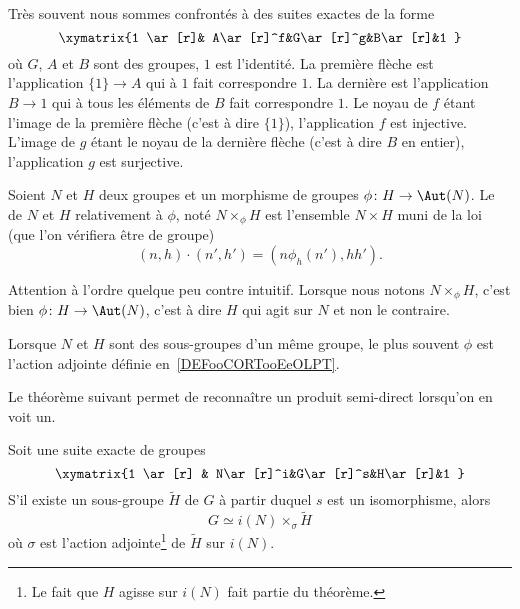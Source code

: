 Très souvent nous sommes confrontés à des suites exactes de la forme
\begin{equation}
    \xymatrix{%
    1 \ar[r]& A\ar[r]^f&G\ar[r]^g&B\ar[r]&1
       }
\end{equation}
où \( G\), \( A\) et \( B\) sont des groupes, \( 1\) est l'identité. La première flèche est l'application \( \{ 1 \}\to A\) qui à \( 1\) fait correspondre \( 1\). La dernière est l'application \( B\to 1\) qui à tous les éléments de \( B\) fait correspondre \( 1\). Le noyau de \( f\) étant l'image de la première flèche (c'est à dire \( \{ 1 \}\)), l'application \( f\) est injective. L'image de \( g\) étant le noyau de la dernière flèche (c'est à dire \( B\) en entier), l'application \( g\) est surjective.

\begin{definition}     \label{DEFooKWEHooISNQzi}
    Soient \( N\) et \( H\) deux groupes et un morphisme de groupes \( \phi\colon H\to \Aut(N)\). Le  de \( N\) et \( H\) relativement à \( \phi\), noté \( N\times_{\phi}H\) est l'ensemble \( N\times H\) muni de la loi (que l'on vérifiera être de groupe)
    \begin{equation}\label{EqDRgbBI}
        (n,h)\cdot (n',h')=(n\phi_h(n'),hh').
    \end{equation}
\end{definition}
Attention à l'ordre quelque peu contre intuitif. Lorsque nous notons \( N\times_{\phi}H\), c'est bien \( \phi\colon H\to \Aut(N)\), c'est à dire \( H\) qui agit sur \( N\) et non le contraire.

Lorsque \( N\) et \( H\) sont des sous-groupes d'un même groupe, le plus souvent \( \phi\) est l'action adjointe définie en~\ref{DEFooCORTooEeOLPT}.

Le théorème suivant permet de reconnaître un produit semi-direct lorsqu'on en voit un.
\begin{theorem}       \label{THOooZNYTooPhnIdE}
    Soit une suite exacte de groupes
    \begin{equation}
    \xymatrix{%
    1 \ar[r]        & N\ar[r]^i&G\ar[r]^s&H\ar[r]&1
       }
    \end{equation}
    S'il existe un sous-groupe \( \tilde H\) de \( G\) à partir duquel \( s\) est un isomorphisme, alors
    \begin{equation}
        G\simeq i(N)\times_{\sigma}\tilde H
    \end{equation}
    où \( \sigma\) est l'action adjointe\footnote{Le fait que \( H\) agisse sur \( i(N)\) fait partie du théorème.} de \( \tilde H\) sur \( i(N)\).
\end{theorem}

